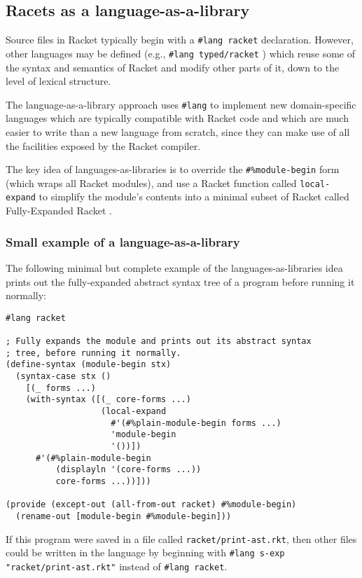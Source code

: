 \documentclass{article}
\begin{document}
\subsection{Racets as a language-as-a-library}
Source files in Racket typically begin with a \texttt{\#lang racket} declaration. However, other languages may be defined (e.g., \texttt{\#lang typed/racket} \cite{typed-racket}) which reuse some of the syntax and semantics of Racket and modify other parts of it, down to the level of lexical structure.

The language-as-a-library approach \cite{typed-racket} uses \texttt{\#lang} to implement new domain-specific languages which are typically compatible with Racket code and which are much easier to write than a new language from scratch, since they can make use of all the facilities exposed by the Racket compiler.

The key idea of languages-as-libraries is to override the \texttt{\#\%module-begin} form (which wraps all Racket modules), and use a Racket function called \texttt{local-expand} to simplify the module's contents into a minimal subset of Racket called Fully-Expanded Racket \cite{fe-racket}.

\subsubsection{Small example of a language-as-a-library}
The following minimal but complete example of the languages-as-libraries idea prints out the fully-expanded abstract syntax tree of a program before running it normally:

\begin{lstlisting}
#lang racket

; Fully expands the module and prints out its abstract syntax
; tree, before running it normally.
(define-syntax (module-begin stx)
  (syntax-case stx ()
    [(_ forms ...)
    (with-syntax ([(_ core-forms ...)
                   (local-expand
                     #'(#%plain-module-begin forms ...)
                     'module-begin
                     '())])
      #'(#%plain-module-begin
          (displayln '(core-forms ...))
          core-forms ...))]))

(provide (except-out (all-from-out racket) #%module-begin)
  (rename-out [module-begin #%module-begin]))
\end{lstlisting}

If this program were saved in a file called \texttt{racket/print-ast.rkt}, then other files could be written in the language by beginning with \texttt{\#lang s-exp "racket/print-ast.rkt"} instead of \texttt{\#lang racket}.
\end{document}
